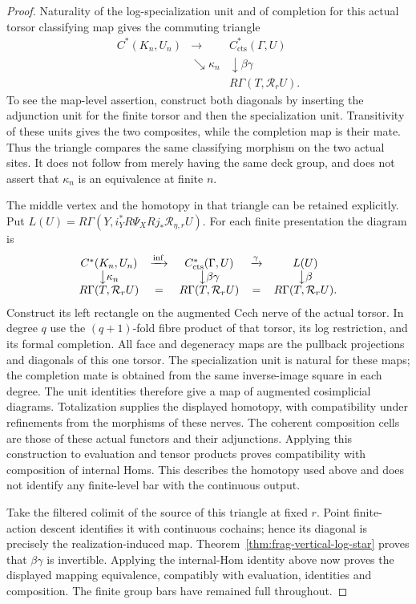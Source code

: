 \documentclass[11pt]{article}
\theoremstyle{definition}
\theoremstyle{remark}
\begin{document}
\begin{proof}
Naturality of the log-specialization unit and of completion for
this actual torsor classifying map gives the commuting triangle
\[
 \begin{array}{ccc}
 C^*(K_n,U_n)&\longrightarrow&C^*_{\mathrm{cts}}(\Gamma,U)\\
 &\searrow\kappa_n&\downarrow\beta\gamma\\
 &&R\Gamma(T,\mathcal R_rU).
 \end{array}
\]
To see the map-level assertion, construct both diagonals by inserting
the adjunction unit for the finite torsor and then the specialization
unit.  Transitivity of these units gives the two composites, while
the completion map is their mate.  Thus the triangle compares the
same classifying morphism on the two actual sites.  It does not
follow from merely having the same deck group, and does not assert
that $\kappa_n$ is an equivalence at finite $n$.

The middle vertex and the homotopy in that triangle can be retained
explicitly.  Put $L(U)=R\Gamma(Y,i_Y^*R\Psi_XRj_*\mathcal R_{\eta,r}U)$.
For each finite presentation the diagram is
\[
\begin{array}{ccccc}
 C^*(K_n,U_n)&\xrightarrow{\mathrm{inf}}&C^*_{\mathrm{cts}}(\Gamma,U)
       &\xrightarrow{\gamma}&L(U)\\
 \big\downarrow\kappa_n&&\big\downarrow\beta\gamma&&\big\downarrow\beta\\
 R\Gamma(T,\mathcal R_rU)&=&R\Gamma(T,\mathcal R_rU)
       &=&R\Gamma(T,\mathcal R_rU).
\end{array}
\]
Construct its left rectangle on the augmented Cech nerve of the
actual torsor.  In degree $q$ use the $(q+1)$-fold fibre product of
that torsor, its log restriction, and its formal completion.  All
face and degeneracy maps are the pullback projections and diagonals
of this one torsor.  The specialization unit is natural for these
maps; the completion mate is obtained from the same inverse-image
square in each degree.  The unit identities therefore give a map
of augmented cosimplicial diagrams.  Totalization supplies the displayed homotopy, with
compatibility under refinements from the morphisms of these nerves.
The coherent composition cells are those of these actual functors
and their adjunctions.  Applying this construction to evaluation
and tensor products proves compatibility with composition of
internal Homs.  This describes the homotopy used above and does
not identify any finite-level bar with the continuous output.

Take the filtered colimit of the source of this triangle at fixed
$r$.  Point finite-action descent identifies it with continuous
cochains; hence its diagonal is precisely the realization-induced
map.  Theorem~\ref{thm:frag-vertical-log-star} proves that $\beta\gamma$ is invertible.
Applying the internal-Hom identity above now proves the displayed
mapping equivalence, compatibly with evaluation, identities and
composition.  The finite group bars have remained full throughout.


\end{proof}
\end{document}
